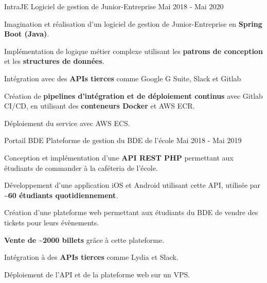 

\begin{cventries}

  \cventry
    {IntraJE} %
    {Logiciel de gestion de Junior-Entreprise} %
    {} %
    {Mai 2018 - Mai 2020} %
    {
      \begin{cvitems} %
        \item {Imagination et réalisation d'un logiciel de gestion de Junior-Entreprise en \textbf{Spring Boot (Java)}.}
        \item {Implémentation de logique métier complexe utilisant les \textbf{patrons de conception} et les \textbf{structures de données}.}
        \item {Intégration avec des \textbf{APIs tierces} comme Google G Suite, Slack et Gitlab}
        \item {Création de \textbf{pipelines d'intégration et de déploiement continus} avec Gitlab CI/CD, en utilisant des \textbf{conteneurs Docker} et AWS ECR.}
        \item {Déploiement du service avec AWS ECS.}
      \end{cvitems}
    }
  \cventry
    {Portail BDE} %
    {Plateforme de gestion du BDE de l'école} %
    {} %
    {Mai 2018 - Mai 2019} %
    {
      \begin{cvitems} %
        \item {Conception et implémentation d'une \textbf{API REST PHP} permettant aux étudiants de commander à la caféteria de l'école.}
        \item {Développement d'une application iOS et Android utilisant cette API, utilisée par \textbf{\textasciitilde60 étudiants quotidiennement}.}
        \item {Création d'une plateforme web permettant aux étudiants du BDE de vendre des tickets pour leurs évènements.}
        \item {\textbf{Vente de \textasciitilde2000 billets} grâce à cette plateforme.}
        \item {Intégration à des \textbf{APIs tierces} comme Lydia et Slack.}
        \item {Déploiement de l'API et de la plateforme web sur un VPS.}
      \end{cvitems}
    }

\end{cventries}

